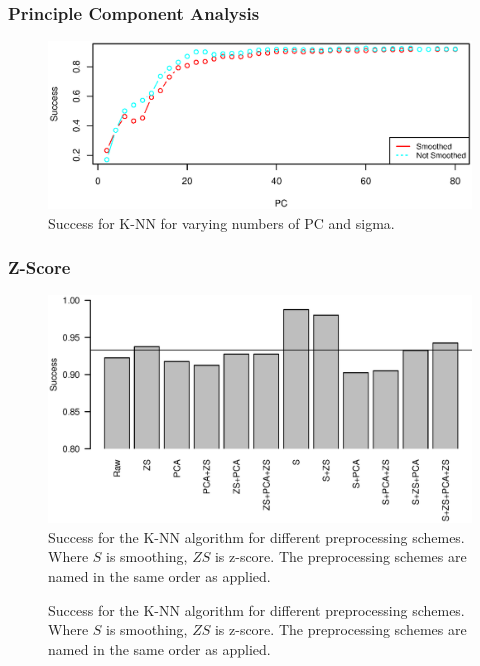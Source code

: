 \subsubsection{Principle Component Analysis}

\begin{figure}[H]
\centering
\includegraphics[width = 1 \textwidth]{graphics/knn_pc}
\caption{Success for K-NN for varying numbers of PC and sigma.}
\end{figure}


\subsubsection{Z-Score}

\begin{figure}[H]
\includegraphics[width = 1 \textwidth]{graphics/knn_zscore_1}
\caption{Success for the K-NN algorithm for different preprocessing schemes.
Where $S$ is smoothing, $ZS$ is z-score.
The preprocessing schemes are named in the same order as applied.}
\end{figure}

\begin{figure}[H]
\caption{Success for the K-NN algorithm for different preprocessing schemes.
Where $S$ is smoothing, $ZS$ is z-score.
The preprocessing schemes are named in the same order as applied.}
\end{figure}


